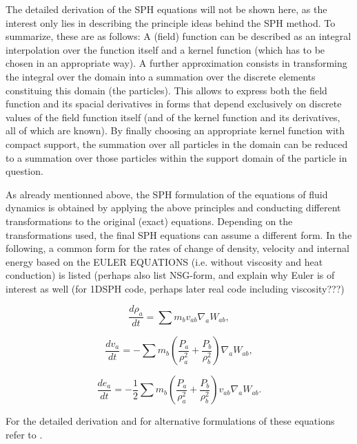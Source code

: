 \documentclass{report}
\begin{document}
The detailed derivation of the SPH equations will not be shown here, as the
interest  only lies in describing the principle ideas behind the SPH
method. To summarize, these are as follows: A (field) function can be
described as an integral interpolation over the function itself and a kernel
function (which has to be chosen in an appropriate way). A further
approximation consists in transforming the integral over the domain into a
summation over the discrete elements constituing this domain (the particles). 
This allows to express both
the field function and its spacial derivatives in forms 
that depend exclusively on discrete values
of the field function itself (and of the kernel function and its derivatives, 
all of which are known). By finally choosing an appropriate kernel function with
compact support, the summation over all particles in the domain can be reduced
to a summation over those particles within the support domain of the particle
in question.

As already mentionned above, the SPH formulation of the equations of fluid
dynamics is obtained by applying the above principles and conducting different
transformations to the original (exact) equations. Depending on the
transformations used, the final SPH equations can assume a different form. In
the following, a common form for the rates of change of density, velocity and
internal energy based on the EULER EQUATIONS (i.e. without viscosity and heat conduction) is
listed\cite{Monaghan2005,Liu2003} (perhaps also list NSG-form, and
explain why Euler is of interest as well (for 1DSPH code, perhaps later real
code including viscosity???)

\begin{equation}
\label{eq:DCR_Euler}
\frac{d\rho _a}{\mathit{dt}}=\sum{m_{b}v_{\mathit{ab}}\nabla _{a}W_{\mathit{ab}}},
\end{equation}

\begin{equation}
\label{eq:VCR_Euler}
\frac{dv_{a}}{\mathit{dt}}=-\sum {m_{b}\left(\frac{P_{a}}{\rho_{a}^{2}}+\frac{P_{b}}{\rho _{b}^{2}}\right)\nabla_{a}W_{ab}},
\end{equation}


\begin{equation}
\label{eq:ECR_Euler}
\frac{de_{a}}{\mathit{dt}}=-\mathit{}\frac{1}{2}\sum{m_{b}\left(\frac{P_{a}}{\rho _{a}^{2}}+\frac{P_{b}}{\rho _{b}^{2}}\right)v_{\mathit{ab}}\nabla _{a}W_{\mathit{ab}}}.
\end{equation}

For the detailed derivation and for alternative formulations of
these equations refer to \cite{Monaghan2005, Liu2003}.
\end{document}
